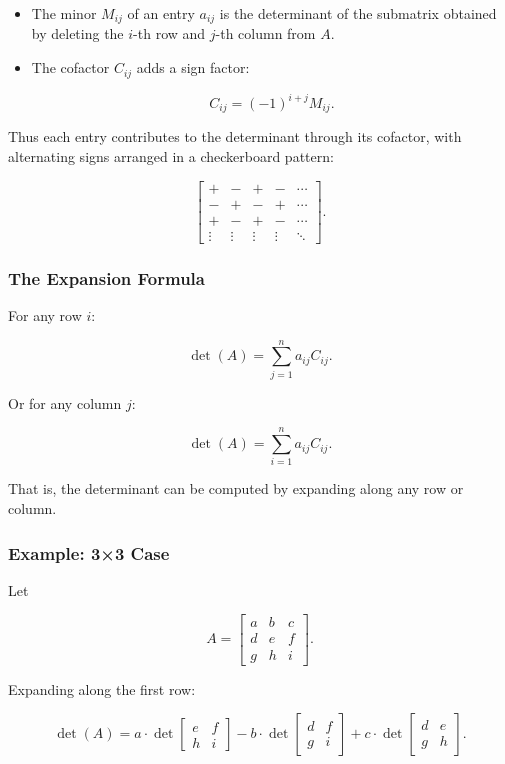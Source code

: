 \documentclass[
  letterpaper,
  DIV=11,
  numbers=noendperiod]{scrreprt}
\begin{document}
\begin{itemize}
\item
  The minor \(M_{ij}\) of an entry \(a_{ij}\) is the determinant of the
  submatrix obtained by deleting the \(i\)-th row and \(j\)-th column
  from \(A\).
\item
  The cofactor \(C_{ij}\) adds a sign factor:

  \[
  C_{ij} = (-1)^{i+j} M_{ij}.
  \]
\end{itemize}

Thus each entry contributes to the determinant through its cofactor,
with alternating signs arranged in a checkerboard pattern:

\[
\begin{bmatrix} 
+ & - & + & - & \cdots \\ 
- & + & - & + & \cdots \\ 
+ & - & + & - & \cdots \\ 
\vdots & \vdots & \vdots & \vdots & \ddots 
\end{bmatrix}.
\]

\subsubsection{The Expansion Formula}\label{the-expansion-formula}

For any row \(i\):

\[
\det(A) = \sum_{j=1}^n a_{ij} C_{ij}.
\]

Or for any column \(j\):

\[
\det(A) = \sum_{i=1}^n a_{ij} C_{ij}.
\]

That is, the determinant can be computed by expanding along any row or
column.

\subsubsection{Example: 3×3 Case}\label{example-33-case-1}

Let

\[
A = \begin{bmatrix} 
a & b & c \\ 
d & e & f \\ 
g & h & i 
\end{bmatrix}.
\]

Expanding along the first row:

\[
\det(A) = a \cdot \det \begin{bmatrix} e & f \\ h & i \end{bmatrix} 
- b \cdot \det \begin{bmatrix} d & f \\ g & i \end{bmatrix} 
+ c \cdot \det \begin{bmatrix} d & e \\ g & h \end{bmatrix}.
\]
\end{document}
